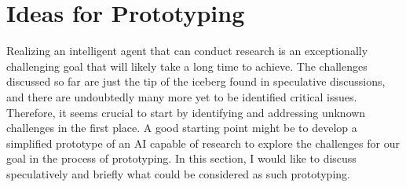 










\section{Ideas for Prototyping}
Realizing an intelligent agent that can conduct research is an exceptionally challenging goal that will likely take a long time to achieve. The challenges discussed so far are just the tip of the iceberg found in speculative discussions, and there are undoubtedly many more yet to be identified critical issues. Therefore, it seems crucial to start by identifying and addressing unknown challenges in the first place. A good starting point might be to develop a simplified prototype of an AI capable of research to explore the challenges for our goal in the process of prototyping. In this section, I would like to discuss speculatively and briefly what could be considered as such prototyping.

